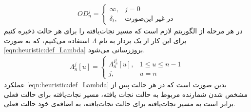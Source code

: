 	\begin{align}\label{eqn:heuristic:def_ordinary_delay}
		OD_n^j = 
		\begin{cases}
			\infty, & \text{$j = 0$} \\
			\delta_t,& \text{در غیر این‌صورت}
		\end{cases}
	\end{align}
	در هر مرحله از الگوریتم لازم است که مسیر نجات‌یافته را برای هر حالت ذخیره کنیم برای این کار از یک بردار به نام $\Lambda$ استفاده می‌کنیم، که به صورت \cref{eqn:heuristic:def_Lambda} بروزرسانی می‌شود. 
	\begin{align}\label{eqn:heuristic:def_Lambda}
		\Lambda_n^j[u] = 
		\begin{cases}
			\Lambda_n^{I_n^j}[u], & 1 \le u \le n-1 \\
			j, 				& u = n
		\end{cases}
	\end{align}
	عملکرد \cref{eqn:heuristic:def_Lambda} بدین صورت است که در هر حالت پس از مشخص شدن شمارنده مربوط به حالت نجات یافته، مسیر نجات‌یافته برای حالت فعلی برابر است به مسیر نجات‌یافته برای حالت نجات‌یافته، به اضافه‌ی خود حالت فعلی. 
